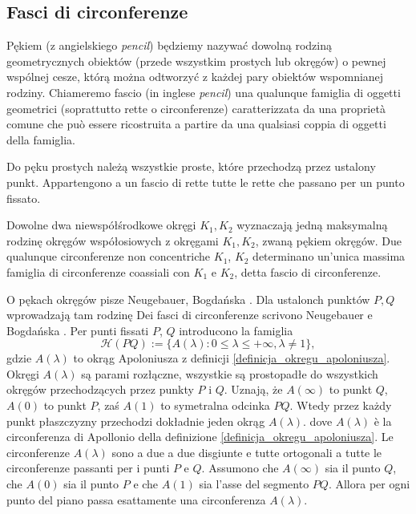 \subsection{Fasci di circonferenze} %

Pękiem (z angielskiego \emph{pencil}) będziemy nazywać dowolną rodziną geometrycznych obiektów (przede wszystkim prostych lub okręgów) o pewnej wspólnej cesze, którą można odtworzyć z każdej pary obiektów wspomnianej rodziny. %
Chiameremo fascio (in inglese \emph{pencil}) una qualunque famiglia di oggetti geometrici (soprattutto rette o circonferenze) caratterizzata da una proprietà comune che può essere ricostruita a partire da una qualsiasi coppia di oggetti della famiglia. %

\begin{example}
	Do pęku prostych należą wszystkie proste, które przechodzą przez ustalony punkt. %
	Appartengono a un fascio di rette tutte le rette che passano per un punto fissato. %
\end{example}

\begin{definition}
	Dowolne dwa niewspółśrodkowe okręgi $K_1, K_2$ wyznaczają jedną maksymalną rodzinę okręgów współosiowych z okręgami $K_1, K_2$, zwaną pękiem okręgów. %
	Due qualunque circonferenze non concentriche $K_1$, $K_2$ determinano un'unica massima famiglia di circonferenze coassiali con $K_1$ e $K_2$, detta fascio di circonferenze. %
\end{definition}

O pękach okręgów pisze Neugebauer, Bogdańska \cite[s. 80]{neugebauer_2018}. %
Dla ustalonch punktów $P, Q$ wprowadzają tam rodzinę %
Dei fasci di circonferenze scrivono Neugebauer e Bogdańska \cite[p. 80]{neugebauer_2018}. %
Per punti fissati $P$, $Q$ introducono la famiglia %
\begin{equation}
	\mathcal H(PQ) := \{A(\lambda) : 0 \le \lambda \le + \infty, \lambda \neq 1 \},
\end{equation}
gdzie $A(\lambda)$ to okrąg Apoloniusza z definicji \ref{definicja_okregu_apoloniusza}. %
Okręgi $A(\lambda)$ są parami rozłączne, wszystkie są prostopadłe do wszystkich okręgów przechodzących przez punkty $P$ i $Q$. %
Uznają, że $A(\infty)$ to punkt $Q$, $A(0)$ to punkt $P$, zaś $A(1)$ to symetralna odcinka $PQ$. %
Wtedy przez każdy punkt płaszczyzny przechodzi dokładnie jeden okrąg $A(\lambda)$. %
dove $A(\lambda)$ è la circonferenza di Apollonio della definizione \ref{definicja_okregu_apoloniusza}. %
Le circonferenze $A(\lambda)$ sono a due a due disgiunte e tutte ortogonali a tutte le circonferenze passanti per i punti $P$ e $Q$. %
Assumono che $A(\infty)$ sia il punto $Q$, che $A(0)$ sia il punto $P$ e che $A(1)$ sia l'asse del segmento $PQ$. %
Allora per ogni punto del piano passa esattamente una circonferenza $A(\lambda)$. %

